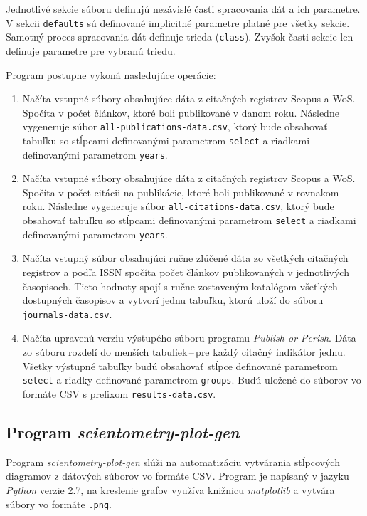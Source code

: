 Jednotlivé sekcie súboru definujú nezávislé časti spracovania dát a ich
parametre. V sekcii \verb|defaults| sú definované implicitné parametre platné
pre všetky sekcie. Samotný proces spracovania dát definuje trieda
(\verb|class|). Zvyšok časti sekcie len definuje parametre pre vybranú triedu.

Program postupne vykoná nasledujúce operácie:

\begin{enumerate}
\item Načíta vstupné súbory obsahujúce dáta z citačných registrov Scopus a
  WoS. Spočíta v počet článkov, ktoré boli publikované v danom roku. Následne
  vygeneruje súbor \verb|all-publications-data.csv|, ktorý bude obsahovať
  tabuľku so stĺpcami definovanými parametrom \verb|select| a riadkami
  definovanými parametrom \verb|years|.
\item Načíta vstupné súbory obsahujúce dáta z citačných registrov Scopus a
  WoS. Spočíta v počet citácii na publikácie, ktoré boli publikované v rovnakom
  roku. Následne vygeneruje súbor \verb|all-citations-data.csv|, ktorý bude
  obsahovať tabuľku so stĺpcami definovanými parametrom \verb|select| a riadkami
  definovanými parametrom \verb|years|.
\item Načíta vstupný súbor obsahujúci ručne zlúčené dáta zo všetkých citačných
  registrov a podľa ISSN spočíta počet článkov publikovaných v jednotlivých
  časopisoch. Tieto hodnoty spojí s ručne zostaveným katalógom všetkých
  dostupných časopisov a vytvorí jednu tabuľku, ktorú uloží do súboru
  \verb|journals-data.csv|.
\item Načíta upravenú verziu výstupého súboru programu \emph{Publish or Perish}.
  Dáta zo súboru rozdelí do menších tabuliek\,--\,pre každý citačný indikátor
  jednu. Všetky výstupné tabuľky budú obsahovať stĺpce definované parametrom
  \verb|select| a riadky definované parametrom \verb|groups|. Budú uložené do
  súborov vo formáte CSV s prefixom \verb|results-data.csv|.
\end{enumerate}


\subsection*{Program \emph{scientometry-plot-gen}}

Program \emph{scientometry-plot-gen} slúži na automatizáciu vytvárania
stĺpcových diagramov z dátových súborov vo formáte CSV. Program je napísaný v
jazyku \emph{Python} verzie 2.7, na kreslenie grafov využíva knižnicu
\emph{matplotlib} a vytvára súbory vo formáte \texttt{.png}.

